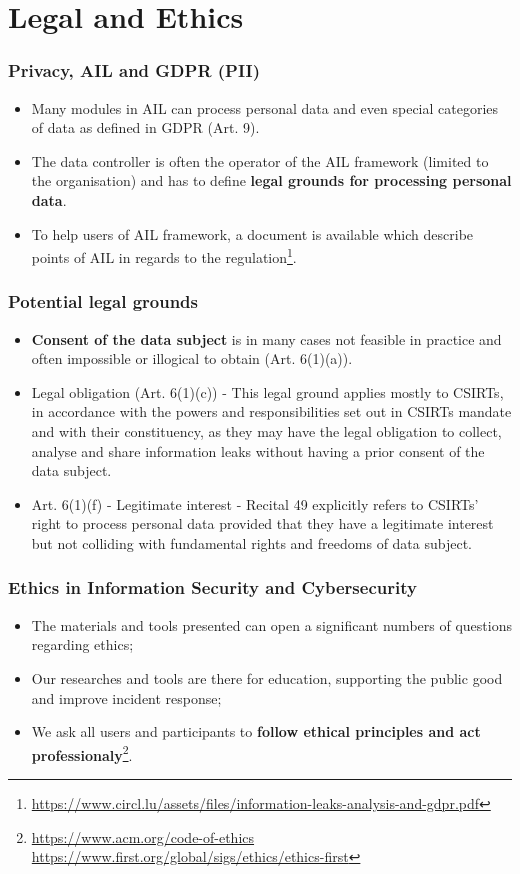 \documentclass[aspectratio=169]{beamer}
\begin{document}
\section{Legal and Ethics}
\begin{frame}
        \frametitle{Privacy, AIL and GDPR (PII)}
        \begin{itemize}
                \item Many modules in AIL can process personal data and even special categories of data as defined in GDPR (Art. 9).
                \item The data controller is often the operator of the AIL framework (limited to the organisation) and has to define {\bf legal grounds for processing personal data}.
                \item To help users of AIL framework, a document is available which describe points of AIL in regards to the regulation\footnote{\url{https://www.circl.lu/assets/files/information-leaks-analysis-and-gdpr.pdf}}.
        \end{itemize}
\end{frame}

\begin{frame}
        \frametitle{Potential legal grounds}
        \begin{itemize}
                \item {\bf Consent of the data subject} is in many cases not feasible in practice and often impossible or illogical to obtain (Art. 6(1)(a)).
                \item Legal obligation (Art. 6(1)(c)) - This legal ground applies mostly to CSIRTs, in accordance with the powers and responsibilities set out in CSIRTs mandate and with their constituency, as they may have the legal obligation to collect, analyse and share information leaks without having a prior consent of the data subject.
				\item Art. 6(1)(f) - Legitimate interest - Recital 49 explicitly refers to CSIRTs’ right to process personal data provided that they have a legitimate interest but not colliding with fundamental rights and freedoms of data subject.
        \end{itemize}
\end{frame}

\begin{frame}
        \frametitle{Ethics in Information Security and Cybersecurity}
        \begin{itemize}
        \item The materials and tools presented can open a significant numbers of questions regarding ethics;
        \item Our researches and tools are there for education, supporting the public good and improve incident response;
        \item We ask all users and participants to {\bf follow ethical principles and act professionaly}\footnote{\url{https://www.acm.org/code-of-ethics} \url{https://www.first.org/global/sigs/ethics/ethics-first}}.
        \end{itemize}
\end{frame}
\end{document}
